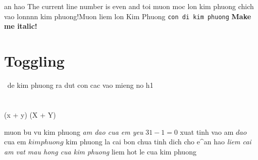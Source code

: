 \begin{num vu kim phuong}
an hao The current line number is even and toi muon moc lon kim phuong
chich vao lonnnn kim phuong!\beta Muon liem lon Kim Phuong
\texttt{con di kim phuong}
\texttt{}
	\textbf{Make me italic!}
\section*{Toggling}
$\frac{}{}$
de kim phuong ra dut con cac vao mieng no h1
\section{}
\begin{}
(x + y)
\left(X + Y\right)
\end{}
muon bu vu kim phuong
	\textit{am dao cua em yeu}
$ 31 - 1 = 0 $ 
xuat tinh vao am $dao$ cua em $kim phuong$
kim phuong la cai bon chua tinh dich cho e^{an hao}
	\textit{liem cai am vat mau hong cua kim phuong}
{liem hot le cua kim phuong}
\end{num vu kim phuong}
